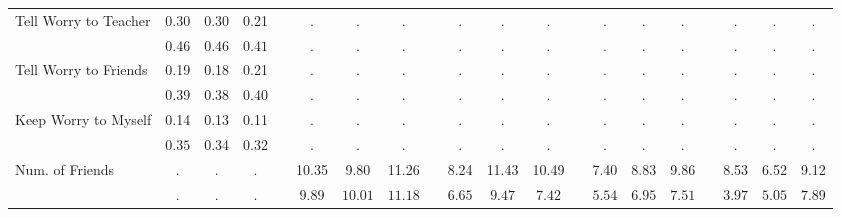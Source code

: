 \begin{center}
{\begin{longtable}{L{5cm} c c c p{.5cm} c c c p{.5cm} c c c p{.5cm} c c c p{.5cm} c c c}
 \quad Tell Worry to Teacher & 0.30 &      0.30 &      0.21 & &         . &         . &         . & &         . &         . &         . & &         . &         . &         . & &         . &         . &         . \\*
 \quad & $\mathit{     0.46}$ & $\mathit{     0.46}$ & $\mathit{     0.41}$ & & $\mathit{        .}$ & $\mathit{        .}$ & $\mathit{        .}$ & & $\mathit{        .}$ & $\mathit{        .}$ & $\mathit{        .}$ & & $\mathit{        .}$ & $\mathit{        .}$ & $\mathit{        .}$ & & $\mathit{        .}$ & $\mathit{        .}$ & $\mathit{        .}$ \\[.2em]
 \quad Tell Worry to Friends & 0.19 &      0.18 &      0.21 & &         . &         . &         . & &         . &         . &         . & &         . &         . &         . & &         . &         . &         . \\*
 \quad & $\mathit{     0.39}$ & $\mathit{     0.38}$ & $\mathit{     0.40}$ & & $\mathit{        .}$ & $\mathit{        .}$ & $\mathit{        .}$ & & $\mathit{        .}$ & $\mathit{        .}$ & $\mathit{        .}$ & & $\mathit{        .}$ & $\mathit{        .}$ & $\mathit{        .}$ & & $\mathit{        .}$ & $\mathit{        .}$ & $\mathit{        .}$ \\[.2em]
 \quad Keep Worry to Myself & 0.14 &      0.13 &      0.11 & &         . &         . &         . & &         . &         . &         . & &         . &         . &         . & &         . &         . &         . \\*
 \quad & $\mathit{     0.35}$ & $\mathit{     0.34}$ & $\mathit{     0.32}$ & & $\mathit{        .}$ & $\mathit{        .}$ & $\mathit{        .}$ & & $\mathit{        .}$ & $\mathit{        .}$ & $\mathit{        .}$ & & $\mathit{        .}$ & $\mathit{        .}$ & $\mathit{        .}$ & & $\mathit{        .}$ & $\mathit{        .}$ & $\mathit{        .}$ \\[.2em]
 \quad Num. of Friends & . &         . &         . & &     10.35 &      9.80 &     11.26 & &      8.24 &     11.43 &     10.49 & &      7.40 &      8.83 &      9.86 & &      8.53 &      6.52 &      9.12 \\*
 \quad & $\mathit{        .}$ & $\mathit{        .}$ & $\mathit{        .}$ & & $\mathit{     9.89}$ & $\mathit{    10.01}$ & $\mathit{    11.18}$ & & $\mathit{     6.65}$ & $\mathit{     9.47}$ & $\mathit{     7.42}$ & & $\mathit{     5.54}$ & $\mathit{     6.95}$ & $\mathit{     7.51}$ & & $\mathit{     3.97}$ & $\mathit{     5.05}$ & $\mathit{     7.89}$ \\[.2em]

\end{longtable}}
\end{center}
